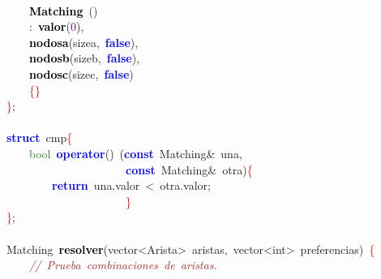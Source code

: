 \mbox{} \\
\mbox{}\ \ \ \ \textbf{\textcolor{Black}{Matching}}\ \textcolor{BrickRed}{()} \\
\mbox{}\ \ \ \ \textcolor{BrickRed}{:}\ \textbf{\textcolor{Black}{valor}}\textcolor{BrickRed}{(}\textcolor{Purple}{0}\textcolor{BrickRed}{),} \\
\mbox{}\ \ \ \ \textbf{\textcolor{Black}{nodosa}}\textcolor{BrickRed}{(}sizea\textcolor{BrickRed}{,}\ \textbf{\textcolor{Blue}{false}}\textcolor{BrickRed}{),} \\
\mbox{}\ \ \ \ \textbf{\textcolor{Black}{nodosb}}\textcolor{BrickRed}{(}sizeb\textcolor{BrickRed}{,}\ \textbf{\textcolor{Blue}{false}}\textcolor{BrickRed}{),} \\
\mbox{}\ \ \ \ \textbf{\textcolor{Black}{nodosc}}\textcolor{BrickRed}{(}sizec\textcolor{BrickRed}{,}\ \textbf{\textcolor{Blue}{false}}\textcolor{BrickRed}{)} \\
\mbox{}\ \ \ \ \textcolor{Red}{\{\}} \\
\mbox{}\textcolor{Red}{\}}\textcolor{BrickRed}{;} \\
\mbox{} \\
\mbox{}\textbf{\textcolor{Blue}{struct}}\ \textcolor{TealBlue}{cmp}\textcolor{Red}{\{} \\
\mbox{}\ \ \ \ \textcolor{ForestGreen}{bool}\ \textbf{\textcolor{Blue}{operator}}\textcolor{BrickRed}{()}\ \textcolor{BrickRed}{(}\textbf{\textcolor{Blue}{const}}\ Matching\textcolor{BrickRed}{\&}\ una\textcolor{BrickRed}{,} \\
\mbox{}\ \ \ \ \ \ \ \ \ \ \ \ \ \ \ \ \ \ \ \ \ \textbf{\textcolor{Blue}{const}}\ Matching\textcolor{BrickRed}{\&}\ otra\textcolor{BrickRed}{)}\textcolor{Red}{\{} \\
\mbox{}\ \ \ \ \ \ \ \ \textbf{\textcolor{Blue}{return}}\ una\textcolor{BrickRed}{.}valor\ \textcolor{BrickRed}{\textless{}}\ otra\textcolor{BrickRed}{.}valor\textcolor{BrickRed}{;} \\
\mbox{}\ \ \ \ \ \ \ \ \ \ \ \ \ \ \ \ \ \ \ \ \ \textcolor{Red}{\}} \\
\mbox{}\textcolor{Red}{\}}\textcolor{BrickRed}{;} \\
\mbox{} \\
\mbox{}\textcolor{TealBlue}{Matching}\ \textbf{\textcolor{Black}{resolver}}\textcolor{BrickRed}{(}\textcolor{TealBlue}{vector\textless{}Arista\textgreater{}\ aristas,\ vector\textless{}int\textgreater{}}\ preferencias\textcolor{BrickRed}{)}\ \textcolor{Red}{\{} \\
\mbox{}\ \ \ \ \textit{\textcolor{Brown}{//\ Prueba\ combinaciones\ de\ aristas.}} \\
